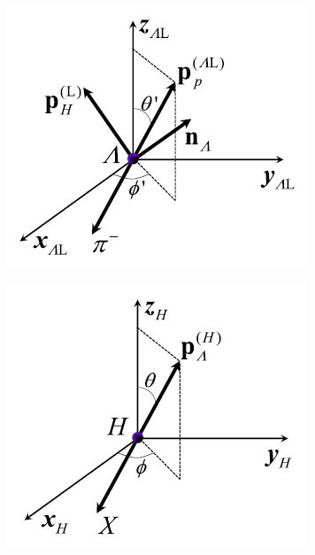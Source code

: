\begin{figure}[t]
	\centering
	\begin{subfigure}{.32\textwidth}
		\includegraphics[width=\textwidth]{graphics/01-standard_model/helicity_frames_a.png}
		\caption{}
		\label{fig:1:frames_of_reference_lambda}
	\end{subfigure}
	\begin{subfigure}{.32\textwidth}
		\includegraphics[width=\textwidth]{graphics/01-standard_model/helicity_frames_b.png}

\end{subfigure}
\end{figure}
